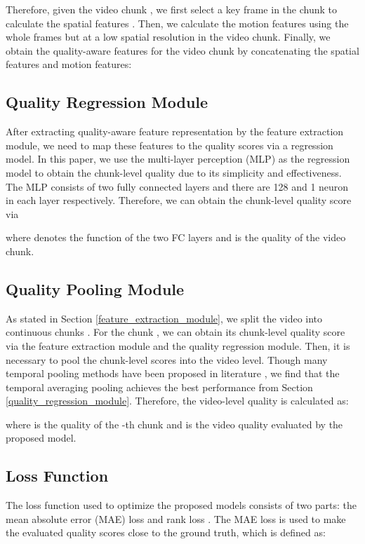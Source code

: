 \documentclass[sigconf]{acmart}
\begin{document}
Therefore, given the video chunk , we first select a key frame in the chunk to calculate the spatial features . Then, we calculate the motion features  using the whole frames but at a low spatial resolution in the video chunk. Finally, we obtain the quality-aware features for the video chunk  by concatenating the spatial features and motion features:


\subsection{Quality Regression Module}
After extracting quality-aware feature representation by the feature extraction module, we need to map these features to the quality scores via a regression model. In this paper, we use the multi-layer perception (MLP) as the regression model to obtain the chunk-level quality due to its simplicity and effectiveness. The MLP consists of two fully connected layers and there are 128 and 1 neuron in each layer respectively. Therefore, we can obtain the chunk-level quality score via

where  denotes the function of the two FC layers and  is the quality of the video chunk.



\subsection{Quality Pooling Module}
As stated in Section \ref{feature_extraction_module}, we split the video  into  continuous chunks . For the chunk , we can obtain its chunk-level quality score  via the feature extraction module and the quality regression module. Then, it is necessary to pool the chunk-level scores into the video level. Though many temporal pooling methods have been proposed in literature \cite{tu2020comparative}\cite{li2019quality}, we find that the temporal averaging pooling achieves the best performance from Section \ref{quality_regression_module}. Therefore, the video-level quality is calculated as:

where  is the quality of the -th chunk and  is the video quality evaluated by the proposed model.


\subsection{Loss Function}
The loss function used to optimize the proposed models consists of two parts: the mean absolute error (MAE) loss and rank loss \cite{wen2021strong}. The MAE loss is used to make the evaluated quality scores close to the ground truth, which is defined as:
\end{document}
